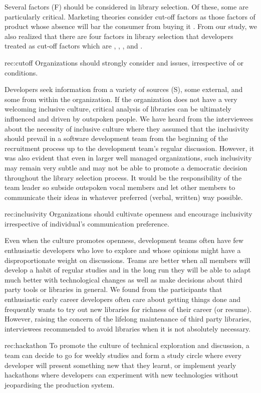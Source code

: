  Several factors (F) should be considered in library selection. Of these, some are particularly critical. Marketing theories consider cut-off factors as those factors of product whose absence will bar the consumer from buying it \cite{blackwell2001consumer}. From our study, we also realized that there are four factors in library selection that developers treated as cut-off factors which are , , , and . 
 \begin{recommendation}{rec:cutoff}
Organizations should strongly consider  and  issues, irrespective of  or  conditions.
\end{recommendation}\medskip


Developers seek information from a variety of sources (S), some external, and some from within the organization. If the organization does not have a very welcoming inclusive culture, critical analysis of libraries can be ultimately influenced and driven by outspoken people. We have heard from the interviewees about the necessity of inclusive culture where they assumed that the inclusivity should prevail in a software development team from the beginning of the recruitment process up to the development team's regular discussion. However, it was also evident that even in larger well managed organizations, such inclusivity may remain very subtle and may not be able to promote a democratic decision throughout the library selection process. It would be the responsibility of the team leader so subside outspoken vocal members and let other members to communicate their ideas in whatever preferred (verbal, written) way possible.
 \begin{recommendation}{rec:inclusivity}
Organizations should cultivate openness and encourage inclusivity irrespective of individual's communication preference. 
\end{recommendation}\medskip

 Even when the culture promotes openness, development teams often have few enthusiastic developers who love to explore and whose opinions might have a disproportionate weight on discussions. Teams are better when all members will develop a habit of regular studies and in the long run they will be able to adapt much better with technological changes as well as make decisions about third party tools or libraries in general. We found from the participants that enthusiastic early career developers often care about getting things done and frequently wants to try out new libraries for richness of their career (or resume). However, raising the concern of the lifelong maintenance of third party libraries, interviewees recommended to avoid libraries when it is not absolutely necessary. 
  \begin{recommendation}{rec:hackathon}
To promote the culture of technical exploration and discussion, a team can decide to go for weekly studies and form a study circle where every developer will present something new that they learnt, or implement yearly hackathons where developers can experiment with new technologies without jeopardising the production system. 
\end{recommendation}


